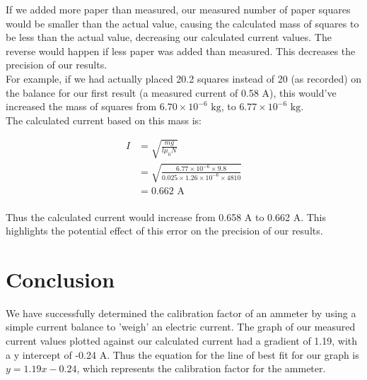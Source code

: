 \documentclass[a4paper,11pt]{article}
\begin{document}
If we added more paper than measured, our measured number of paper squares would
be smaller than the actual value, causing the calculated mass of squares to be
less than the actual value, decreasing our calculated current values. The
reverse would happen if less paper was added than measured. This decreases the
precision of our results. \\

For example, if we had actually placed 20.2 squares instead of 20 (as recorded)
on the balance for our first result (a measured current of 0.58 A),
this would've increased the mass of squares from $6.70 \times 10^{-6}\mbox{ kg}$,
to $6.77 \times 10^{-6}\mbox{ kg}$. \\

The calculated current based on this mass is:

$$
\begin{aligned}
	I & = \sqrt{\frac{m g}{l \mu_0 N}} \\
	& = \sqrt{\frac{6.77 \times 10^{-6} \times 9.8}{0.025 \times 1.26 \times 10^{-6} \times 4810}} \\
	& = 0.662\mbox{ A} \\
\end{aligned}
$$

Thus the calculated current would increase from 0.658 A to 0.662 A. This
highlights the potential effect of this error on the precision of our results.


\section{Conclusion}

We have successfully determined the calibration factor of an ammeter by using a
simple current balance to 'weigh' an electric current. The graph of our
measured current values plotted against our calculated current had a gradient of
1.19, with a y intercept of -0.24 A. Thus the equation for the line of best fit
for our graph is $y = 1.19 x - 0.24$, which represents the calibration factor
for the ammeter.
\end{document}
